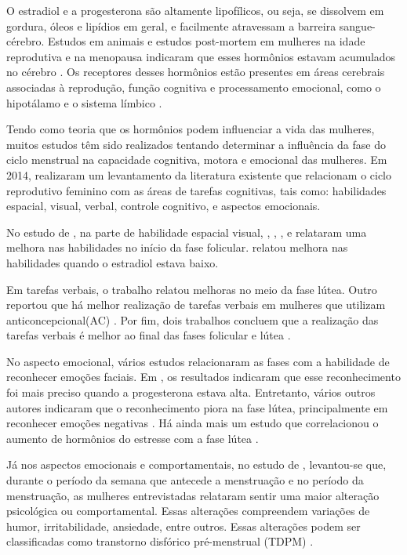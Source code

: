 O estradiol e a progesterona são altamente lipofílicos, ou seja, se dissolvem em gordura, óleos e 
lipídios em geral, e facilmente atravessam a barreira sangue-cérebro. Estudos em animais e estudos 
post-mortem em mulheres na idade reprodutiva e na menopausa indicaram que esses hormônios estavam 
acumulados no cérebro \cite{bixo1997}. Os receptores desses hormônios estão presentes em áreas 
cerebrais associadas à reprodução, função cognitiva e processamento emocional, como o hipotálamo e o 
sistema límbico \cite{gruber2002, brinton2008}.


Tendo como teoria que os hormônios podem influenciar a vida das mulheres, muitos estudos têm sido 
realizados tentando determinar a influência da fase do ciclo menstrual na capacidade cognitiva, 
motora e emocional das mulheres. Em 2014,  realizaram um levantamento da 
literatura existente que relacionam o ciclo reprodutivo feminino com as áreas de tarefas cognitivas, 
tais como: habilidades espacial, visual, verbal, controle cognitivo, e aspectos emocionais.


No estudo de , na parte de habilidade espacial visual, 
, , ,  e  relataram uma melhora 
nas habilidades no início da fase folicular.  relatou melhora nas habilidades quando o 
estradiol estava baixo. 


Em tarefas verbais, o trabalho \cite{maki2002} relatou melhoras no meio da fase lútea. Outro 
reportou que há melhor realização de tarefas verbais em mulheres que utilizam anticoncepcional(AC) 
\cite{mordecai2008}. Por fim, dois trabalhos concluem que a realização das tarefas verbais é melhor 
ao final das fases folicular e lútea \cite{Rosenberg2002, solis2004}.


No aspecto emocional, vários estudos relacionaram as fases com a habilidade de reconhecer emoções 
faciais. Em , os resultados indicaram que esse reconhecimento foi mais 
preciso quando a progesterona estava alta. Entretanto, vários outros autores indicaram que o 
reconhecimento piora na fase lútea, principalmente em reconhecer emoções negativas \cite{gasbarri2008}.
Há ainda mais um estudo que correlacionou o aumento de hormônios do estresse com a fase lútea \cite{kirschbaum1999}.



Já nos aspectos emocionais e comportamentais, no estudo de , levantou-se que, 
durante o período da semana que antecede a menstruação e no período da menstruação, as mulheres 
entrevistadas relataram sentir uma maior alteração psicológica ou comportamental. Essas alterações 
compreendem variações de humor, irritabilidade, ansiedade, entre outros. Essas alterações podem ser 
classificadas como transtorno disfórico pré-menstrual (TDPM) \cite{ACOG2000}.

